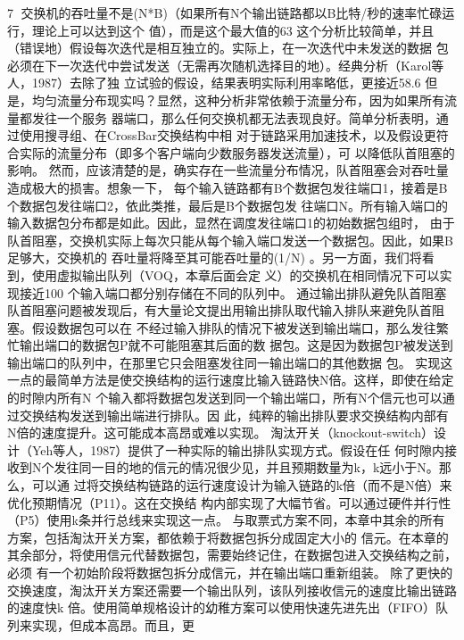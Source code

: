                                                                7
交换机的吞吐量不是(N*B)（如果所有N个输出链路都以B比特/秒的速率忙碌运行，理论上可以达到这个
值），而是这个最大值的63%
这个分析比较简单，并且（错误地）假设每次迭代是相互独立的。实际上，在一次迭代中未发送的数据
包必须在下一次迭代中尝试发送（无需再次随机选择目的地）。经典分析（Karol等人，1987）去除了独
立试验的假设，结果表明实际利用率略低，更接近58.6%
但是，均匀流量分布现实吗？显然，这种分析非常依赖于流量分布，因为如果所有流量都发往一个服务
器端口，那么任何交换机都无法表现良好。简单分析表明，通过使用搜寻组、在CrossBar交换结构中相
对于链路采用加速技术，以及假设更符合实际的流量分布（即多个客户端向少数服务器发送流量），可
以降低队首阻塞的影响。
然而，应该清楚的是，确实存在一些流量分布情况，队首阻塞会对吞吐量造成极大的损害。想象一下，
每个输入链路都有B个数据包发往端口1，接着是B个数据包发往端口2，依此类推，最后是B个数据包发
往端口N。所有输入端口的输入数据包分布都是如此。因此，显然在调度发往端口1的初始数据包组时，
由于队首阻塞，交换机实际上每次只能从每个输入端口发送一个数据包。因此，如果B足够大，交换机的
吞吐量将降至其可能吞吐量的(1/N) 。另一方面，我们将看到，使用虚拟输出队列（VOQ，本章后面会定
义）的交换机在相同情况下可以实现接近100%
个输入端口都分别存储在不同的队列中。
通过输出排队避免队首阻塞
队首阻塞问题被发现后，有大量论文提出用输出排队取代输入排队来避免队首阻塞。假设数据包可以在
不经过输入排队的情况下被发送到输出端口，那么发往繁忙输出端口的数据包P就不可能阻塞其后面的数
据包。这是因为数据包P被发送到输出端口的队列中，在那里它只会阻塞发往同一输出端口的其他数据
包。
实现这一点的最简单方法是使交换结构的运行速度比输入链路快N倍。这样，即使在给定的时隙内所有N
个输入都将数据包发送到同一个输出端口，所有N个信元也可以通过交换结构发送到输出端进行排队。因
此，纯粹的输出排队要求交换结构内部有N倍的速度提升。这可能成本高昂或难以实现。
淘汰开关（knockout-switch）设计（Yeh等人，1987）提供了一种实际的输出排队实现方式。假设在任
何时隙内接收到N个发往同一目的地的信元的情况很少见，并且预期数量为k，k远小于N。那么，可以通
过将交换结构链路的运行速度设计为输入链路的k倍（而不是N倍）来优化预期情况（P11）。这在交换结
构内部实现了大幅节省。可以通过硬件并行性（P5）使用k条并行总线来实现这一点。
与取票式方案不同，本章中其余的所有方案，包括淘汰开关方案，都依赖于将数据包拆分成固定大小的
信元。在本章的其余部分，将使用信元代替数据包，需要始终记住，在数据包进入交换结构之前，必须
有一个初始阶段将数据包拆分成信元，并在输出端口重新组装。
除了更快的交换速度，淘汰开关方案还需要一个输出队列，该队列接收信元的速度比输出链路的速度快k
倍。使用简单规格设计的幼稚方案可以使用快速先进先出（FIFO）队列来实现，但成本高昂。而且，更
